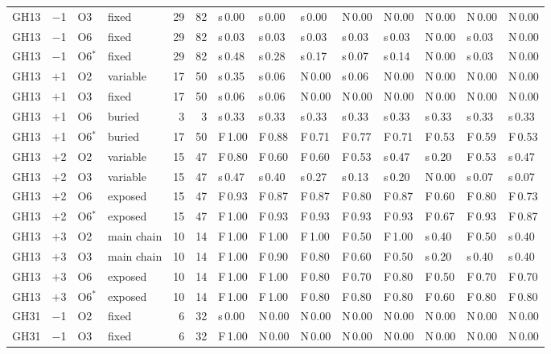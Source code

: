 \documentclass[preprint,12pt]{elsarticle}
\begin{document}
{\begin{longtable}{llllrrllllllll}
GH13 & $-$1 & O3 & fixed & 29 & 82 & s\,0.00 & s\,0.00 & s\,0.00 & N\,0.00 & N\,0.00 & N\,0.00 & N\,0.00 & N\,0.00\\
GH13 & $-$1 & O6 & fixed & 29 & 82 & s\,0.03 & s\,0.03 & s\,0.03 & s\,0.03 & s\,0.03 & N\,0.00 & s\,0.03 & N\,0.00\\
GH13 & $-$1 & O6$^\ast$ & fixed & 29 & 82 & s\,0.48 & s\,0.28 & s\,0.17 & s\,0.07 & s\,0.14 & N\,0.00 & s\,0.03 & N\,0.00\\
GH13 & $+$1 & O2 & variable & 17 & 50 & s\,0.35 & s\,0.06 & N\,0.00 & s\,0.06 & N\,0.00 & N\,0.00 & N\,0.00 & N\,0.00\\
GH13 & $+$1 & O3 & fixed & 17 & 50 & s\,0.06 & s\,0.06 & N\,0.00 & N\,0.00 & N\,0.00 & N\,0.00 & N\,0.00 & N\,0.00\\
GH13 & $+$1 & O6 & buried & 3 & 3 & s\,0.33 & s\,0.33 & s\,0.33 & s\,0.33 & s\,0.33 & s\,0.33 & s\,0.33 & s\,0.33\\
GH13 & $+$1 & O6$^\ast$ & buried & 17 & 50 & F\,1.00 & F\,0.88 & F\,0.71 & F\,0.77 & F\,0.71 & F\,0.53 & F\,0.59 & F\,0.53\\
GH13 & $+$2 & O2 & variable & 15 & 47 & F\,0.80 & F\,0.60 & F\,0.60 & F\,0.53 & s\,0.47 & s\,0.20 & F\,0.53 & s\,0.47\\
GH13 & $+$2 & O3 & variable & 15 & 47 & s\,0.47 & s\,0.40 & s\,0.27 & s\,0.13 & s\,0.20 & N\,0.00 & s\,0.07 & s\,0.07\\
GH13 & $+$2 & O6 & exposed & 15 & 47 & F\,0.93 & F\,0.87 & F\,0.87 & F\,0.80 & F\,0.87 & F\,0.60 & F\,0.80 & F\,0.73\\
GH13 & $+$2 & O6$^\ast$ & exposed & 15 & 47 & F\,1.00 & F\,0.93 & F\,0.93 & F\,0.93 & F\,0.93 & F\,0.67 & F\,0.93 & F\,0.87\\
GH13 & $+$3 & O2 & main chain & 10 & 14 & F\,1.00 & F\,1.00 & F\,1.00 & F\,0.50 & F\,1.00 & s\,0.40 & F\,0.50 & s\,0.40\\
GH13 & $+$3 & O3 & main chain & 10 & 14 & F\,1.00 & F\,0.90 & F\,0.80 & F\,0.60 & F\,0.50 & s\,0.20 & s\,0.40 & s\,0.40\\
GH13 & $+$3 & O6 & exposed & 10 & 14 & F\,1.00 & F\,1.00 & F\,0.80 & F\,0.70 & F\,0.80 & F\,0.50 & F\,0.70 & F\,0.70\\
GH13 & $+$3 & O6$^\ast$ & exposed & 10 & 14 & F\,1.00 & F\,1.00 & F\,0.80 & F\,0.80 & F\,0.80 & F\,0.60 & F\,0.80 & F\,0.80\\
\addlinespace
GH31 & $-$1 & O2 & fixed & 6 & 32 & s\,0.00 & N\,0.00 & N\,0.00 & N\,0.00 & N\,0.00 & N\,0.00 & N\,0.00 & N\,0.00\\
GH31 & $-$1 & O3 & fixed & 6 & 32 & F\,1.00 & N\,0.00 & N\,0.00 & N\,0.00 & N\,0.00 & N\,0.00 & N\,0.00 & N\,0.00\\

\end{longtable}}
\end{document}
